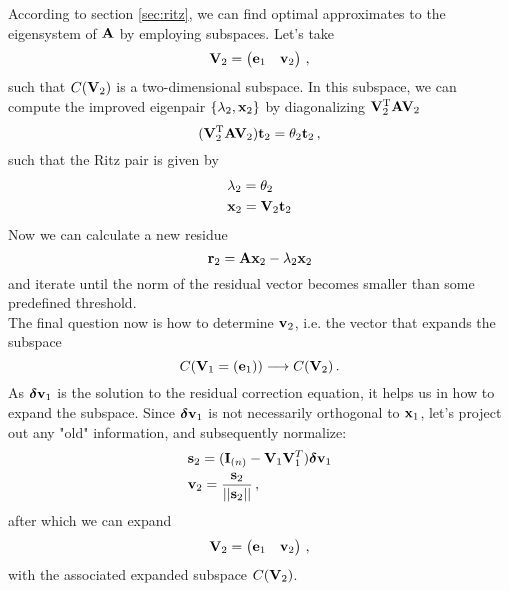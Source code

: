         According to section \ref{sec:ritz}, we can find optimal approximates to the eigensystem of $\vb{A}$ by employing subspaces. Let's take
        \begin{equation}
            \vb{V}_2 = \begin{pmatrix} \vb{e}_1 & \vb{v}_2 \end{pmatrix} \thinspace ,
        \end{equation}
        such that $C(\vb{V}_2)$ is a two-dimensional subspace. In this subspace, we can compute the improved eigenpair $\qty{\lambda_2, \vb{x}_2}$ by diagonalizing $\vb{V}_{2}^\text{T} \vb{A} \vb{V}_2$
        \begin{equation}
            (\vb{V}_2^\text{T} \vb{A} \vb{V}_2) \vb{t}_2 = \theta_2 \vb{t}_2 \thinspace ,
        \end{equation}
        such that the Ritz pair is given by
        \begin{align}
            &\lambda_2 = \theta_2 \\
            &\vb{x}_2 = \vb{V}_2 \vb{t}_2
        \end{align}
        Now we can calculate a new residue
        \begin{equation}
            \vb{r}_2 = \vb{A} \vb{x}_2 - \lambda_2 \vb{x}_2
        \end{equation}
        and iterate until the norm of the residual vector becomes smaller than some predefined threshold. \\

        The final question now is how to determine $\vb{v}_2$, i.e. the vector that expands the subspace
        \begin{equation}
            C(\vb{V}_1 = (\vb{e}_1)) \longrightarrow C(\vb{V}_2) \thinspace .
        \end{equation}
        As $\boldsymbol{\delta} \vb{v}_1$ is the solution to the residual correction equation, it helps us in how to expand the subspace. Since $\boldsymbol{\delta} \vb{v}_1$ is not necessarily orthogonal to $\vb{x}_1$, let's project out any "old" information, and subsequently normalize:
        \begin{align}
            & \vb{s}_2 = (\vb{I}_{(n)} - \vb{V}_1 \vb{V}_1^T) \boldsymbol{\delta} \vb{v}_1 \\
            & \vb{v}_2 = \frac{\vb{s}_2}{||\vb{s}_2||} \thinspace ,
        \end{align}
        after which we can expand
        \begin{equation}
            \vb{V}_2 = \begin{pmatrix} \vb{e}_1 & \vb{v}_2 \end{pmatrix} \thinspace ,
        \end{equation}
        with the associated expanded subspace $C(\vb{V}_2)$.

